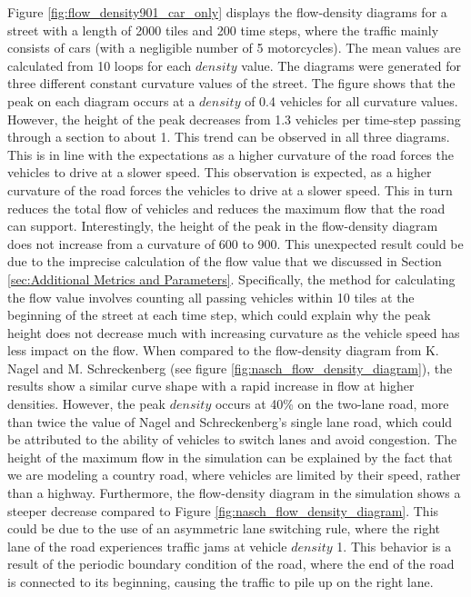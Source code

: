 Figure \ref{fig:flow_density901_car_only} displays the flow-density diagrams for a street with a length of 2000 tiles and 200 time steps, where the traffic mainly consists of cars (with a negligible number of 5 motorcycles). The mean values are calculated from 10 loops for each $density$ value. The diagrams were generated for three different constant curvature values of the street. The figure shows that the peak on each diagram occurs at a $density$ of 0.4 vehicles for all curvature values. However, the height of the peak decreases from 1.3 vehicles per time-step passing through a section to about 1. This trend can be observed in all three diagrams. This is in line with the expectations as a higher curvature of the road forces the vehicles to drive at a slower speed. This observation is expected, as a higher curvature of the road forces the vehicles to drive at a slower speed. This in turn reduces the total flow of vehicles and reduces the maximum flow that the road can support. Interestingly, the height of the peak in the flow-density diagram does not increase from a curvature of 600 to 900. This unexpected result could be due to the imprecise calculation of the flow value that we discussed in Section \ref{sec:Additional Metrics and Parameters}. Specifically, the method for calculating the flow value involves counting all passing vehicles within 10 tiles at the beginning of the street at each time step, which could explain why the peak height does not decrease much with increasing curvature as the vehicle speed has less impact on the flow.
When compared to the flow-density diagram from K. Nagel and M. Schreckenberg (see figure \ref{fig:nasch_flow_density_diagram}), the results show a similar curve shape with a rapid increase in flow at higher densities. However, the peak $density$ occurs at 40\% on the two-lane road, more than twice the value of Nagel and Schreckenberg's single lane road, which could be attributed to the ability of vehicles to switch lanes and avoid congestion. The height of the maximum flow in the simulation can be explained by the fact that we are modeling a country road, where vehicles are limited by their speed, rather than a highway. Furthermore, the flow-density diagram in the simulation shows a steeper decrease compared to Figure \ref{fig:nasch_flow_density_diagram}. This could be due to the use of an asymmetric lane switching rule, where the right lane of the road experiences traffic jams at vehicle $density$ 1. This behavior is a result of the periodic boundary condition of the road, where the end of the road is connected to its beginning, causing the traffic to pile up on the right lane.\\


